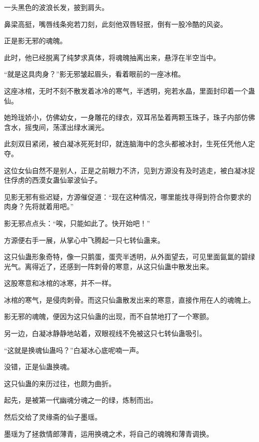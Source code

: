 
\begin{this_body}



一头黑色的波浪长发，披到肩头。

鼻梁高挺，嘴唇线条宛若刀刻，此刻他双唇轻抿，倒有一股冷酷的风姿。

正是影无邪的魂魄。

此时，他已经脱离了纯梦求真体，将魂魄抽离出来，悬浮在半空当中。

“就是这具肉身？”影无邪皱起眉头，看着眼前的一座冰棺。

这座冰棺，无时不刻不散发着冰冷的寒气，半透明，宛若水晶，里面封印着一个蛊仙。

她玲珑娇小，仿佛幼女，一身雕花的绿衣，双耳吊坠着两颗玉珠子，珠子内部仿佛含水，摇曳间，荡漾出绿水澜光。

此刻双目紧闭，被白凝冰死死封印，就连脑海中的念头都被冰封，生死任凭他人定夺。

这位女仙自然不是别人，正是之前眼力不济，见到方源没有及时逃走，被白凝冰捉住俘虏的西漠女蛊仙翠波仙子。

见影无邪有些迟疑，方源催促道：“现在这种情况，哪里能找寻得到符合你要求的肉身？先将就着用吧。”

影无邪点点头：“唉，只能如此了。快开始吧！”

方源便右手一展，从掌心中飞腾起一只七转仙蛊来。

这只仙蛊形象奇特，像一只鹅蛋，蛋壳半透明，从外面望去，可见里面氤氲的碧绿光气。离得近了，还感到一阵刺骨的寒意，从这只仙蛊中散发出来。

这股寒意和冰棺的冰寒，并不一样。

冰棺的寒气，是侵肉刺骨。而这只仙蛊散发出来的寒意，直接作用在人的魂魄上。

影无邪的魂魄，便因为这只仙蛊的出现，而不自禁地打了一个寒颤。

另一边，白凝冰静静地站着，双眼视线不免被这只七转仙蛊吸引。

“这就是换魂仙蛊吗？”白凝冰心底呢喃一声。

没错，正是仙蛊换魂。

这只仙蛊的来历过往，也颇为曲折。

起先，是被第一代幽魂分魂之一的绿，炼制而出。

然后交给了灵缘斋的仙子墨瑶。

墨瑶为了拯救情郎薄青，运用换魂之术，将自己的魂魄和薄青调换。


\end{this_body}
